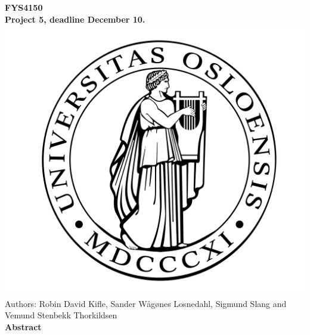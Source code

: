 \documentclass[10pt,a4paper]{article}
\begin{document}
\begin{center}

{\LARGE\bf
FYS4150\\
\vspace{0.5cm}
Project 5, deadline December 10.
}
 \includegraphics[scale=0.075]{figures/uio.png}\\
Authors: Robin David Kifle, Sander Wågønes Losnedahl, Sigmund Slang and Vemund Stenbekk Thorkildsen\\
\vspace{1cm}
{\LARGE\bf
Abstract
}\\
\end{center}
\end{document}
